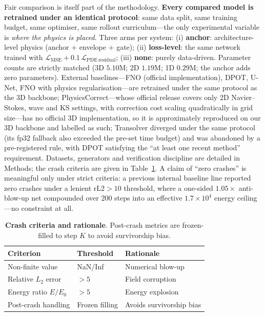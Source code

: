 \documentclass[11pt,a4paper]{article}
\begin{document}
Fair comparison is itself part of the methodology. \textbf{Every compared model is retrained under an identical protocol}: same data split, same training budget, same optimiser, same rollout curriculum---the only experimental variable is \emph{where the physics is placed}. Three arms per system: (i) \textbf{anchor}: architecture-level physics (anchor $+$ envelope $+$ gate); (ii) \textbf{loss-level}: the same network trained with $\mathcal{L}_{\mathrm{MSE}}+0.1\,\mathcal{L}_{\mathrm{PDE\ residual}}$; (iii) \textbf{none}: purely data-driven. Parameter counts are strictly matched (3D $5.10$M; 2D $1.19$M; 1D $0.29$M; the anchor adds zero parameters). External baselines---FNO (official implementation\cite{kossaifi2024library}), DPOT\cite{hao2024dpot}, U-Net\cite{ronneberger2015}, FNO with physics regularisation---are retrained under the same protocol as the 3D backbone; PhysicsCorrect\cite{huang2025physicorrect}---whose official release covers only 2D Navier--Stokes, wave and KS settings, with correction cost scaling quadratically in grid size---has no official 3D implementation, so it is approximately reproduced on our 3D backbone and labelled as such; Transolver\cite{wu2024transolver} diverged under the same protocol (its fp32 fallback also exceeded the pre-set time budget) and was abandoned by a pre-registered rule, with DPOT satisfying the ``at least one recent method'' requirement. Datasets, generators and verification discipline are detailed in Methods; the crash criteria are given in Table~\ref{tab:crash}. A claim of ``zero crashes'' is meaningful only under strict criteria: a previous internal baseline line reported zero crashes under a lenient rL2${}>10$ threshold, where a one-sided $1.05\times$ anti-blow-up net compounded over 200 steps into an effective $1.7\times10^{4}$ energy ceiling---no constraint at all.

\begin{table}[htbp]
\centering\small
\caption{\textbf{Crash criteria and rationale}. Post-crash metrics are frozen-filled to step $K$ to avoid survivorship bias.}
\label{tab:crash}
\begin{tabular}{lll}
\toprule
Criterion & Threshold & Rationale \\
\midrule
Non-finite value & NaN/Inf & Numerical blow-up \\
Relative $L_2$ error & $>5$ & Field corruption \\
Energy ratio $E/E_0$ & $>5$ & Energy explosion \\
Post-crash handling & Frozen filling & Avoids survivorship bias \\
\bottomrule
\end{tabular}
\end{table}
\end{document}
